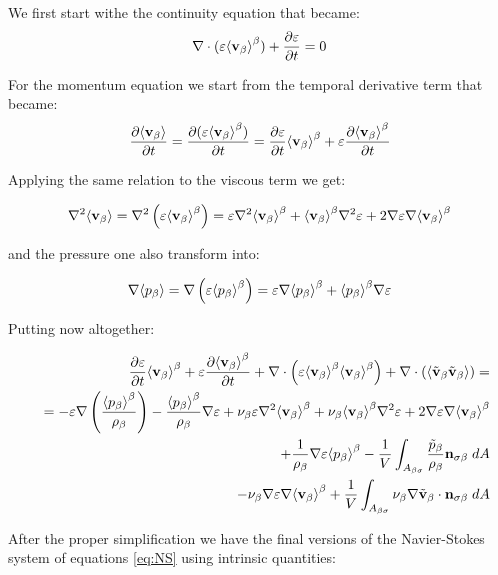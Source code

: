 We first start withe the continuity equation that became:
$$
\nabla \cdot (\varepsilon\meani{\vb} ) + \derp{\varepsilon}{t}= 0
$$

For the momentum equation we start from the temporal derivative term that became:
$$
\derp{\means{\vb}}{t} = \derp{(\varepsilon\meani{\vb})}{t} = \derp{\varepsilon}{t}\meani{\vb} + \varepsilon \derp{\meani{\vb}}{t}
$$

Applying the same relation to the viscous term we get:

\begin{equation}
	\nabla^2 \means{\vb} = \nabla^2 \left( \varepsilon \meani{\vb} \right) = \varepsilon \nabla^2 \meani{\vb} + \meani{\vb} \nabla^2 \varepsilon +2 \nabla \varepsilon \nabla \meani{\vb}
\end{equation}

and the pressure one also transform into:

\begin{equation}
\nabla \means{\pb} = \nabla \left( \varepsilon \meani{\pb} \right) = \varepsilon \nabla \meani{\pb} + \meani{\pb} \nabla \varepsilon
\end{equation}

Putting now altogether:

\begin{eqnarray}
&& \derp{\varepsilon}{t}\meani{\vb} + \varepsilon \derp{\meani{\vb}}{t} + \nabla \cdot \left(\varepsilon \meani{\vb}\meani{\vb}\right)   + \nabla \cdot \left(\means{\vbt \vbt}\right) = \nonumber \\
&&= -\varepsilon \nabla \left(\dfrac{\meani{\pb}}{\rho_{\beta}}\right) - \dfrac{\meani{\pb}}{\rho_{\beta}} \nabla \varepsilon + \nub \varepsilon \nabla^2 \meani{\vb} + \nub \meani{\vb} \nabla^2 \varepsilon + 2 \nabla \varepsilon \nabla \meani{\vb} \nonumber \\
&&+\dfrac{1}{\rho_{\beta}}\nabla\varepsilon \meani{\pb} - \dfrac{1}{V} \int_{A_{\beta \sigma}} \dfrac{\pbt}{\rho_{\beta}} \nbs \;dA \nonumber \\
&&- \nub \nabla \varepsilon \nabla \meani{\vb} + \dfrac{1}{V} \int_{A_{\beta \sigma}} \nub \nabla \vbt \cdot \nbs \;dA
\end{eqnarray}

After the proper simplification we have the final versions of the Navier-Stokes system of equations \eqref{eq:NS} using intrinsic quantities:

